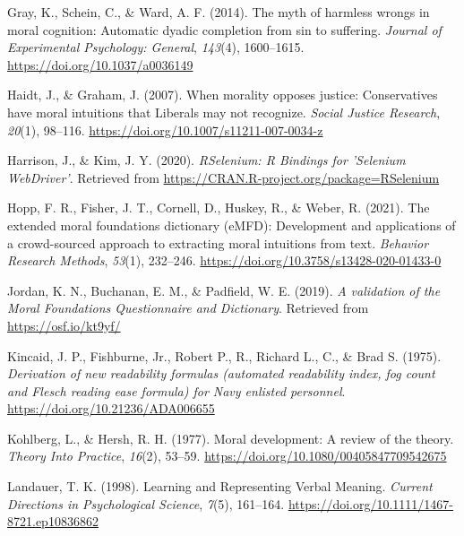 \documentclass[
  man,floatsintext]{apa6}
\newlength{\cslhangindent}
\newlength{\cslentryspacingunit} %
\newenvironment{CSLReferences}[2] %
 {%
  \setlength{\parindent}{0pt}
  \ifodd #1
  \let\oldpar\par
  \def\par{\hangindent=\cslhangindent\oldpar}
  \fi
  \setlength{\parskip}{#2\cslentryspacingunit}
 }%
 {}
\begin{document}
\begin{CSLReferences}{1}{0}
\leavevmode{}%
Gray, K., Schein, C., \& Ward, A. F. (2014). The myth of harmless wrongs in moral cognition: Automatic dyadic completion from sin to suffering. \emph{Journal of Experimental Psychology: General}, \emph{143}(4), 1600--1615. \url{https://doi.org/10.1037/a0036149}

\leavevmode{}%
Haidt, J., \& Graham, J. (2007). {When morality opposes justice: Conservatives have moral intuitions that Liberals may not recognize}. \emph{Social Justice Research}, \emph{20}(1), 98--116. \url{https://doi.org/10.1007/s11211-007-0034-z}

\leavevmode{}%
Harrison, J., \& Kim, J. Y. (2020). \emph{{RSelenium}: {R} {Bindings} for '{Selenium} {WebDriver}'}. Retrieved from \url{https://CRAN.R-project.org/package=RSelenium}

\leavevmode{}%
Hopp, F. R., Fisher, J. T., Cornell, D., Huskey, R., \& Weber, R. (2021). The extended moral foundations dictionary (eMFD): Development and applications of a crowd-sourced approach to extracting moral intuitions from text. \emph{Behavior Research Methods}, \emph{53}(1), 232--246. \url{https://doi.org/10.3758/s13428-020-01433-0}

\leavevmode{}%
Jordan, K. N., Buchanan, E. M., \& Padfield, W. E. (2019). \emph{{A validation of the Moral Foundations Questionnaire and Dictionary}}. Retrieved from \url{https://osf.io/kt9yf/}

\leavevmode{}%
Kincaid, J. P., Fishburne, Jr., Robert P., R., Richard L., C., \& Brad S. (1975). \emph{Derivation of new readability formulas (automated readability index, fog count and {F}lesch reading ease formula) for {N}avy enlisted personnel}. \url{https://doi.org/10.21236/ADA006655}

\leavevmode{}%
Kohlberg, L., \& Hersh, R. H. (1977). {Moral development: A review of the theory}. \emph{Theory Into Practice}, \emph{16}(2), 53--59. \url{https://doi.org/10.1080/00405847709542675}

\leavevmode{}%
Landauer, T. K. (1998). {Learning and Representing Verbal Meaning}. \emph{Current Directions in Psychological Science}, \emph{7}(5), 161--164. \url{https://doi.org/10.1111/1467-8721.ep10836862}


\end{CSLReferences}
\end{document}
